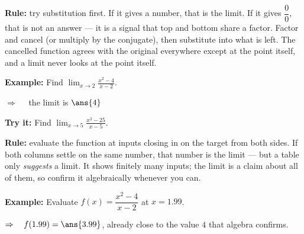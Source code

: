 \documentclass[12pt]{article}
\begin{document}


\begin{formulabox}
\textbf{Rule:} try substitution first. If it gives a number, that is the limit. If it gives
$\dfrac{0}{0}$, that is not an answer --- it is a signal that top and bottom share a factor.
Factor and cancel (or multiply by the conjugate), then substitute into what is left. The
cancelled function agrees with the original everywhere except at the point itself, and a limit
never looks at the point itself.
\end{formulabox}

\begin{examplebox}
\textbf{Example:} \quad Find $\displaystyle\lim_{x \to 2} \frac{x^2 - 4}{x - 2}$.

$\Rightarrow\quad$ the limit is $\ans{4}$
\end{examplebox}

\begin{tryitbox}
\textbf{Try it:} \quad Find $\displaystyle\lim_{x \to 5} \frac{x^2 - 25}{x - 5}$.\\[2pt]
\end{tryitbox}


\begin{formulabox}
\textbf{Rule:} evaluate the function at inputs closing in on the target from both sides. If
both columns settle on the same number, that number is the limit --- but a table only
\emph{suggests} a limit. It shows finitely many inputs; the limit is a claim about all of them,
so confirm it algebraically whenever you can.
\end{formulabox}

\begin{examplebox}
\textbf{Example:} \quad Evaluate $f(x) = \dfrac{x^2 - 4}{x - 2}$ at $x = 1.99$.

$\Rightarrow\quad f(1.99) = \ans{3.99}$, already close to the value $4$ that algebra confirms.
\end{examplebox}
\end{document}
